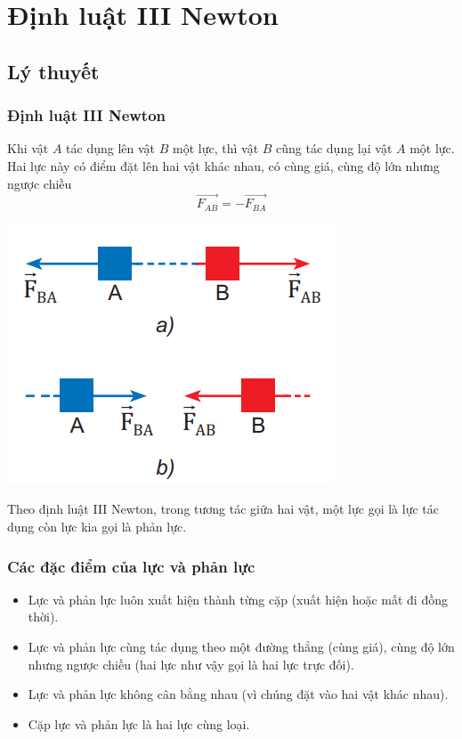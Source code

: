 \let\lesson\undefined
\newcommand{\lesson}{\phantomlesson{Bài 11: Ba định luật Newton về chuyển động}}
\chapter[Định luật III Newton]{Định luật III Newton}
\setcounter{section}{0}
\section{Lý thuyết}
\subsection{Định luật III Newton}
Khi vật $A$ tác dụng lên vật $B$ một lực, thì vật $B$ cũng tác dụng lại vật $A$ một lực. Hai lực này có điểm đặt lên hai vật khác nhau, có cùng giá, cùng độ lớn nhưng ngược chiều
$$\overrightarrow{F_{AB}}=-\overrightarrow{F_{BA}}$$
\begin{center}
	\includegraphics[width=0.3\linewidth]{../figs/VN10-2023-PH-TP017-1}
\end{center}
Theo định luật III Newton, trong tương tác giữa hai vật, một lực gọi là lực tác dụng còn lực kia gọi là phản lực.
\subsection{Các đặc điểm của lực và phản lực}
\begin{itemize}
	\item Lực và phản lực luôn xuất hiện thành từng cặp (xuất hiện hoặc mất đi đồng thời).
	\item Lực và phản lực cùng tác dụng theo một đường thẳng (cùng giá), cùng độ lớn nhưng ngược chiều (hai lực như vậy gọi là hai lực trực đối).
	\item Lực và phản lực không cân bằng nhau (vì chúng đặt vào hai vật khác nhau).
	\item Cặp lực và phản lực là hai lực cùng loại.
\end{itemize}
